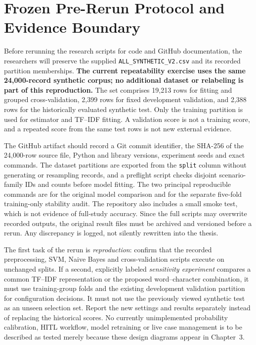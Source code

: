 \section{Frozen Pre-Rerun Protocol and Evidence Boundary}
\label{sec:prerun}
Before rerunning the research scripts for code and GitHub documentation, the researchers will preserve the supplied \texttt{ALL\_SYNTHETIC\_V2.csv} and its recorded partition memberships. \textbf{The current repeatability exercise uses the same 24,000-record synthetic corpus; no additional dataset or relabeling is part of this reproduction.} The set comprises 19,213 rows for fitting and grouped cross-validation, 2,399 rows for fixed development validation, and 2,388 rows for the historically evaluated synthetic test. Only the training partition is used for estimator and TF--IDF fitting. A validation score is not a training score, and a repeated score from the same test rows is not new external evidence.

The GitHub artifact should record a Git commit identifier, the SHA-256 of the 24,000-row source file, Python and library versions, experiment seeds and exact commands. The dataset partitions are exported from the \texttt{split} column without generating or resampling records, and a preflight script checks disjoint scenario-family IDs and counts before model fitting. The two principal reproducible commands are  for the original model comparison and  for the separate five-fold training-only stability audit. The repository also includes a small smoke test, which is not evidence of full-study accuracy. Since the full scripts may overwrite recorded outputs, the original result files must be archived and versioned before a rerun. Any discrepancy is logged, not silently rewritten into the thesis.

The first task of the rerun is \emph{reproduction}: confirm that the recorded preprocessing, SVM, Naive Bayes and cross-validation scripts execute on unchanged splits. If a second, explicitly labeled \emph{sensitivity experiment} compares a common TF--IDF representation or the proposed word--character combination, it must use training-group folds and the existing development validation partition for configuration decisions. It must not use the previously viewed synthetic test as an unseen selection set. Report the new settings and results separately instead of replacing the historical scores. No currently unimplemented probability calibration, HITL workflow, model retraining or live case management is to be described as tested merely because these design diagrams appear in Chapter~3.


